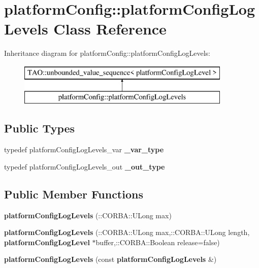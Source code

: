 \section{platform\+Config\+:\+:platform\+Config\+Log\+Levels Class Reference}
\label{classplatformConfig_1_1platformConfigLogLevels}
Inheritance diagram for platform\+Config\+:\+:platform\+Config\+Log\+Levels\+:\begin{figure}[H]
\begin{center}
\leavevmode
\includegraphics[height=2.000000cm]{classplatformConfig_1_1platformConfigLogLevels}
\end{center}
\end{figure}
\subsection*{Public Types}
\begin{DoxyCompactItemize}
\item 
typedef platform\+Config\+Log\+Levels\+\_\+var {\bfseries \+\_\+var\+\_\+type}\label{classplatformConfig_1_1platformConfigLogLevels_a8b990f4465b91fe726cbd284373faa04}

\item 
typedef platform\+Config\+Log\+Levels\+\_\+out {\bfseries \+\_\+out\+\_\+type}\label{classplatformConfig_1_1platformConfigLogLevels_aa6b0c493406b2de2363746c3d48edd00}

\end{DoxyCompactItemize}
\subsection*{Public Member Functions}
\begin{DoxyCompactItemize}
\item 
{\bfseries platform\+Config\+Log\+Levels} (\+::C\+O\+R\+B\+A\+::\+U\+Long max)\label{classplatformConfig_1_1platformConfigLogLevels_a3bdad4121efc4bdae7a8851c28003794}

\item 
{\bfseries platform\+Config\+Log\+Levels} (\+::C\+O\+R\+B\+A\+::\+U\+Long max,\+::C\+O\+R\+B\+A\+::\+U\+Long length, {\bf platform\+Config\+Log\+Level} $\ast$buffer,\+::C\+O\+R\+B\+A\+::\+Boolean release=false)\label{classplatformConfig_1_1platformConfigLogLevels_a64fc2e872a4a919e267ce399138c211b}

\item 
{\bfseries platform\+Config\+Log\+Levels} (const {\bf platform\+Config\+Log\+Levels} \&)\label{classplatformConfig_1_1platformConfigLogLevels_a4317001e5c28165b31877729a0894aa2}

\end{DoxyCompactItemize}
